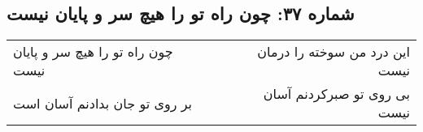 \begin{center}
\section*{شماره ۳۷: چون راه تو را هیچ سر و پایان نیست}
\label{sec:037}
\begin{longtable}{l p{0.5cm} r}
چون راه تو را هیچ سر و پایان نیست
&&
این درد من سوخته را درمان نیست
\\
بر روی تو جان بدادنم آسان است
&&
بی روی تو صبرکردنم آسان نیست
\\
\end{longtable}
\end{center}
